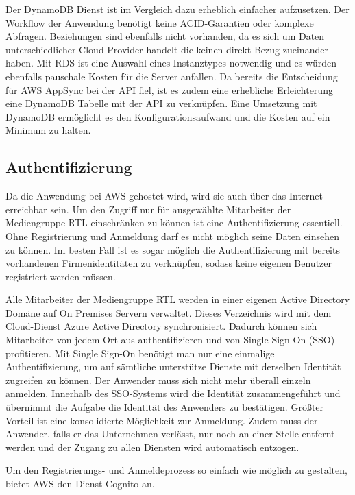 {Der DynamoDB Dienst ist im Vergleich dazu erheblich einfacher aufzusetzen.
Der Workflow der Anwendung benötigt keine ACID-Garantien oder komplexe Abfragen. Beziehungen sind ebenfalls nicht vorhanden, da es sich um Daten unterschiedlicher
Cloud Provider handelt die keinen direkt Bezug zueinander haben.
Mit RDS ist eine Auswahl eines Instanztypes notwendig und es würden ebenfalls pauschale Kosten für die Server anfallen.
Da bereits die Entscheidung für AWS AppSync bei der API fiel, ist es zudem eine erhebliche Erleichterung eine DynamoDB Tabelle mit der API zu verknüpfen.
Eine Umsetzung mit DynamoDB ermöglicht es den Konfigurationsaufwand und die Kosten auf ein Minimum zu halten.


\subsection{Authentifizierung}
\label{Authentifizierung}
Da die Anwendung bei AWS gehostet wird, wird sie auch über das Internet erreichbar sein.
Um den Zugriff nur für ausgewählte Mitarbeiter der Mediengruppe RTL einschränken zu können ist eine Authentifizierung essentiell.
Ohne Registrierung und Anmeldung darf es nicht möglich seine Daten einsehen zu können.
Im besten Fall ist es sogar möglich die Authentifizierung mit bereits vorhandenen Firmenidentitäten zu verknüpfen, sodass keine eigenen
Benutzer registriert werden müssen.

Alle Mitarbeiter der Mediengruppe RTL werden in einer eigenen Active Directory Domäne auf On Premises Servern verwaltet.
Dieses Verzeichnis wird mit dem Cloud-Dienst Azure Active Directory synchronisiert.
Dadurch können sich Mitarbeiter von jedem Ort aus authentifizieren und von Single Sign-On (SSO) profitieren.
Mit Single Sign-On benötigt man nur eine einmalige Authentifizierung, um auf sämtliche unterstütze Dienste mit derselben Identität zugreifen zu können.
Der Anwender muss sich nicht mehr überall einzeln anmelden.
Innerhalb des SSO-Systems wird die Identität zusammengeführt und übernimmt die Aufgabe die Identität des Anwenders zu bestätigen.
Größter Vorteil ist eine konsolidierte Möglichkeit zur Anmeldung. Zudem muss der Anwender, falls er das Unternehmen verlässt, nur noch an einer Stelle entfernt werden und der Zugang zu allen Diensten wird automatisch entzogen.

Um den Registrierungs- und Anmeldeprozess so einfach wie möglich zu gestalten, bietet AWS den Dienst Cognito an.

}
